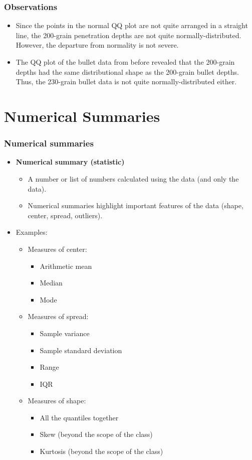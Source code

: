 \documentclass{beamer}
\numberwithin{equation}{section}
\begin{document}
\begin{frame}
\frametitle{Observations}
\begin{itemize}
\item Since the points in the normal QQ plot are not quite arranged in a straight line, the 200-grain penetration depths are not quite normally-distributed. However, the departure from normality is not severe.
\pause \item The QQ plot of the bullet data from before revealed that the 200-grain depths had the same distributional shape as the 200-grain bullet depths. Thus, the 230-grain bullet data is not quite normally-distributed either.
\end{itemize}
\end{frame}


\section{Numerical Summaries}

\begin{frame}
\frametitle{Numerical summaries}
\begin{itemize}
\item {\bf Numerical summary (statistic)}
\begin{itemize}
\item A number or list of numbers calculated using the data (and only the data).
\pause \item Numerical summaries highlight important features of the data (shape, center, spread, outliers).
\end{itemize}
\pause \item Examples:
\begin{itemize}
\item Measures of center:
\begin{itemize}
\item Arithmetic mean
\pause \item Median
\pause \item Mode
\end{itemize}
\pause \item Measures of spread:
\begin{itemize}
 \item Sample variance
\pause \item Sample standard deviation
\pause \item Range
\pause \item IQR
\end{itemize}
\pause \item Measures of shape:
\begin{itemize}
\item All the quantiles together
\pause  \item Skew (beyond the scope of the class) 
\pause \item Kurtosis (beyond the scope of the class)
\end{itemize}
\end{itemize}
\end{itemize}
\end{frame}
\end{document}
